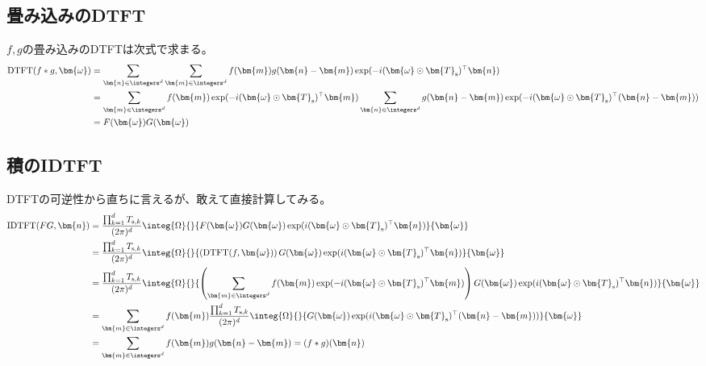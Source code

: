 				\subsection{畳み込みのDTFT}
					$f,g$の畳み込みのDTFTは次式で求まる。
					\begin{align*}
						\text{DTFT}(f*g,\bm{\omega}) &= \sum_{\bm{n}\in\integers^d} \sum_{\bm{m}\in\integers^d}f(\bm{m})g(\bm{n}-\bm{m})\exp(-i(\bm{\omega}\odot\bm{T}_\text{s})^\top\bm{n}) \\
						&= \sum_{\bm{m}\in\integers^d} f(\bm{m})\exp(-i(\bm{\omega}\odot\bm{T}_\text{s})^\top\bm{m}) \sum_{\bm{n}\in\integers^d} g(\bm{n}-\bm{m})\exp(-i(\bm{\omega}\odot\bm{T}_\text{s})^\top(\bm{n}-\bm{m})) \\
						&= F(\bm{\omega})G(\bm{\omega})
					\end{align*}
				\subsection{積のIDTFT}
					DTFTの可逆性から直ちに言えるが、敢えて直接計算してみる。
					\begin{align*}
						\text{IDTFT}(FG,\bm{n}) &= \frac{\prod_{k=1}^d T_{\text{s},k}}{(2\pi)^d}\integ{\Omega}{}{F(\bm{\omega})G(\bm{\omega})\exp(i(\bm{\omega}\odot\bm{T}_\text{s})^\top\bm{n})}{\bm{\omega}} \\
						&= \frac{\prod_{k=1}^d T_{\text{s},k}}{(2\pi)^d}\integ{\Omega}{}{\left(\text{DTFT}(f,\bm{\omega})\right)G(\bm{\omega})\exp(i(\bm{\omega}\odot\bm{T}_\text{s})^\top\bm{n})}{\bm{\omega}} \\
						&= \frac{\prod_{k=1}^d T_{\text{s},k}}{(2\pi)^d}\integ{\Omega}{}{\left(\sum_{\bm{m}\in\integers^d} f(\bm{m})\exp(-i(\bm{\omega}\odot\bm{T}_\text{s})^\top\bm{m})\right)G(\bm{\omega})\exp(i(\bm{\omega}\odot\bm{T}_\text{s})^\top\bm{n})}{\bm{\omega}} \\
						&= \sum_{\bm{m}\in\integers^d} f(\bm{m}) \frac{\prod_{k=1}^d T_{\text{s},k}}{(2\pi)^d} \integ{\Omega}{}{G(\bm{\omega})\exp(i(\bm{\omega}\odot\bm{T}_\text{s})^\top(\bm{n}-\bm{m}))}{\bm{\omega}} \\
						&= \sum_{\bm{m}\in\integers^d} f(\bm{m})g(\bm{n}-\bm{m}) = (f*g)(\bm{n})
					\end{align*}
